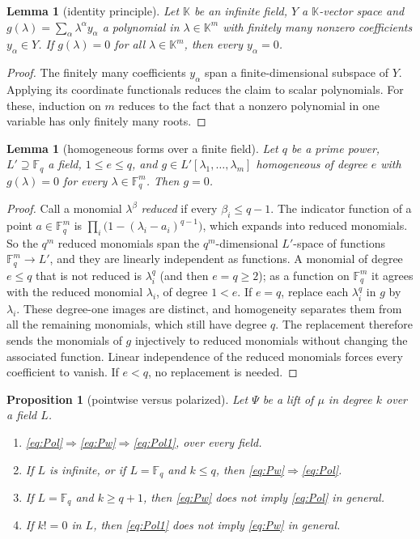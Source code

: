 \documentclass[11pt]{amsart}
\newtheorem{lemma}[theorem]{Lemma}
\newtheorem{proposition}[theorem]{Proposition}
\theoremstyle{definition}
\theoremstyle{remark}
\numberwithin{equation}{section}
\newcommand{\F}{\mathbb F}
\theoremstyle{plain}
\theoremstyle{definition}
\theoremstyle{plain}
\begin{document}
\begin{lemma}[identity principle]\label{lem:idprinc}
Let $\mathbb K$ be an infinite field, $Y$ a $\mathbb K$\nobreakdash-vector space and $g(\lambda)=\sum_\alpha\lambda^\alpha y_\alpha$ a
polynomial in $\lambda\in\mathbb K^m$ with finitely many nonzero coefficients $y_\alpha\in Y$. If $g(\lambda)=0$ for all
$\lambda\in\mathbb K^m$, then every $y_\alpha=0$.
\end{lemma}

\begin{proof}
The finitely many coefficients $y_\alpha$ span a finite-dimensional subspace of $Y$. Applying its coordinate
functionals reduces the claim to scalar polynomials. For these, induction on $m$ reduces to the fact that a nonzero
polynomial in one variable has only finitely many roots.
\end{proof}

\begin{lemma}[homogeneous forms over a finite field]\label{lem:forms}
Let $q$ be a prime power, $L'\supseteq\F_q$ a field, $1\le e\le q$, and $g\in L'[\lambda_1,\dots,\lambda_m]$ homogeneous of
degree $e$ with $g(\lambda)=0$ for every $\lambda\in\F_q^m$. Then $g=0$.
\end{lemma}

\begin{proof}
Call a monomial $\lambda^\beta$ \emph{reduced} if every $\beta_i\le q-1$. The indicator function of a point
$a\in\F_q^m$ is $\prod_i\bigl(1-(\lambda_i-a_i)^{q-1}\bigr)$, which expands into reduced monomials. So the $q^m$ reduced
monomials span the $q^m$\nobreakdash-dimensional $L'$\nobreakdash-space of functions $\F_q^m\to L'$, and they are linearly independent as
functions. A monomial of degree $e\le q$ that is not reduced is $\lambda_i^q$ (and then $e=q\ge2$); as a function on
$\F_q^m$ it agrees with the reduced monomial $\lambda_i$, of degree $1<e$. If $e=q$, replace each $\lambda_i^q$ in $g$ by
$\lambda_i$. These degree-one images are distinct, and homogeneity separates them from all the remaining monomials,
which still have degree $q$. The replacement therefore sends the monomials of $g$ injectively to reduced monomials
without changing the associated function. Linear independence of the reduced monomials forces every coefficient to
vanish. If $e<q$, no replacement is needed.
\end{proof}

\begin{proposition}[pointwise versus polarized]\label{prop:diag}
Let $\Psi$ be a lift of $\mu$ in degree $k$ over a field $L$.
\begin{enumerate}
\item \eqref{eq:Pol}$\Rightarrow$\eqref{eq:Pw}$\Rightarrow$\eqref{eq:Pol1}, over every field.
\item If $L$ is infinite, or if $L=\F_q$ and $k\le q$, then \eqref{eq:Pw}$\Rightarrow$\eqref{eq:Pol}.
\item If $L=\F_q$ and $k\ge q+1$, then \eqref{eq:Pw} does not imply \eqref{eq:Pol} in general.
\item If $k!=0$ in $L$, then \eqref{eq:Pol1} does not imply \eqref{eq:Pw} in general.
\end{enumerate}
\end{proposition}
\end{document}
